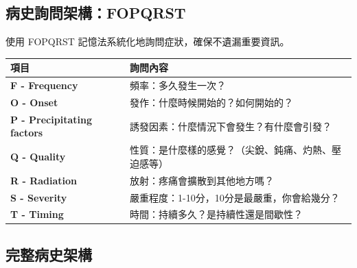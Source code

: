 \documentclass[12pt,a4paper]{article}
\newcommand{\note}[1]{
    \par
    \noindent
    \begin{tcolorbox}[
        colback=emergency_blue!5!white,
        colframe=emergency_blue,
        title=\textbf{重點提醒},
        fonttitle=\bfseries,
        boxrule=0.5pt,
        arc=3pt,
        left=6pt,
        right=6pt,
        top=6pt,
        bottom=6pt
    ]
    #1
    \end{tcolorbox}
}
\begin{document}
\subsection{病史詢問架構：FOPQRST}

\note{使用 FOPQRST 記憶法系統化地詢問症狀，確保不遺漏重要資訊。}

\begin{longtable}{>{\bfseries}p{3cm}p{10cm}}
\toprule
\textbf{項目} & \textbf{詢問內容} \\
\midrule
\endhead
F - Frequency & 頻率：多久發生一次？\\
\midrule
O - Onset & 發作：什麼時候開始的？如何開始的？\\
\midrule
P - Precipitating \newline factors & 誘發因素：什麼情況下會發生？有什麼會引發？\\
\midrule
Q - Quality & 性質：是什麼樣的感覺？（尖銳、鈍痛、灼熱、壓迫感等）\\
\midrule
R - Radiation & 放射：疼痛會擴散到其他地方嗎？\\
\midrule
S - Severity & 嚴重程度：1-10分，10分是最嚴重，你會給幾分？\\
\midrule
T - Timing & 時間：持續多久？是持續性還是間歇性？\\
\bottomrule
\end{longtable}

\subsection{完整病史架構}
\end{document}
